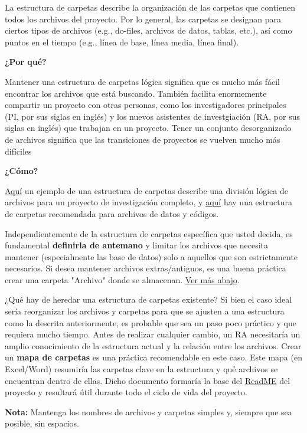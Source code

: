 \documentclass[11pt,en]{elegantpaper}
\begin{document}
La estructura de carpetas describe la organización de las carpetas que contienen todos los archivos del proyecto. Por lo general, las carpetas se designan para ciertos tipos de archivos (e.g., do-files, archivos de datos, tablas, etc.), así como puntos en el tiempo (e.g., línea de base, línea media, línea final).

\textbf{¿Por qué?} 

Mantener una estructura de carpetas lógica significa que es mucho más fácil encontrar los archivos que está buscando. También facilita enormemente compartir un proyecto con otras personas, como los investigadores principales (PI, por sus siglas en inglés) y los nuevos asistentes de investgiación (RA, por sus siglas en inglés) que trabajan en un proyecto. Tener un conjunto desorganizado de archivos significa que las transiciones de proyectos se vuelven mucho más difíciles


\textbf{¿Cómo?}

\hyperref[fig:carpetas]{Aquí} un ejemplo de una estructura de carpetas describe una división lógica de archivos para un proyecto de investigación completo, y \hyperref[fig:code]{aquí} hay una estructura de carpetas recomendada para archivos de datos y códigos. 

Independientemente de la estructura de carpetas específica que usted decida, es fundamental \textbf{definirla de antemano} y limitar los archivos que necesita mantener (especialmente las base de datos) solo a aquellos que son estrictamente necesarios. Si desea mantener archivos extras/antiguos, es una buena práctica crear una carpeta "Archivo" donde se almacenan. \hyperref[sec:doorganizar]{Ver más abajo}.

¿Qué hay de heredar una estructura de carpetas existente? Si bien el caso ideal sería reorganizar los archivos y carpetas para que se ajusten a una estructura como la descrita anteriormente, es probable que sea un paso poco práctico y que requiera mucho tiempo. Antes de realizar cualquier cambio, un RA necesitaría un amplio conocimiento de la estructura actual y la relación entre los archivos. Crear un \textbf{mapa de carpetas} es una práctica recomendable en este caso. Este mapa (en Excel/Word) resumiría las carpetas clave en la estructura y qué archivos se encuentran dentro de ellas. Dicho documento formaría la base del \href{http://www.poverty-action.org/research-transparency/example-readme-files}{ReadME} del proyecto y resultará útil durante todo el ciclo de vida del proyecto.

\textbf{Nota:} Mantenga los nombres de archivos y carpetas simples y, siempre que sea posible, sin espacios.
\end{document}
